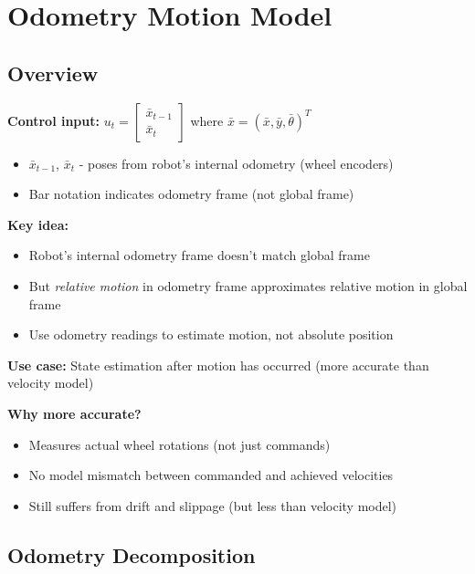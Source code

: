 \section{Odometry Motion Model}

\subsection{Overview}

\textbf{Control input:} $u_t = \begin{bmatrix} \bar{x}_{t-1} \\ \bar{x}_t \end{bmatrix}$ where $\bar{x} = (\bar{x}, \bar{y}, \bar{\theta})^T$
\begin{itemize}
    \item $\bar{x}_{t-1}$, $\bar{x}_t$ - poses from robot's internal odometry (wheel encoders)
    \item Bar notation indicates odometry frame (not global frame)
\end{itemize}

\textbf{Key idea:}
\begin{itemize}
    \item Robot's internal odometry frame doesn't match global frame
    \item But \textit{relative motion} in odometry frame approximates relative motion in global frame
    \item Use odometry readings to estimate motion, not absolute position
\end{itemize}

\textbf{Use case:} State estimation after motion has occurred (more accurate than velocity model)

\textbf{Why more accurate?}
\begin{itemize}
    \item Measures actual wheel rotations (not just commands)
    \item No model mismatch between commanded and achieved velocities
    \item Still suffers from drift and slippage (but less than velocity model)
\end{itemize}

\subsection{Odometry Decomposition}

